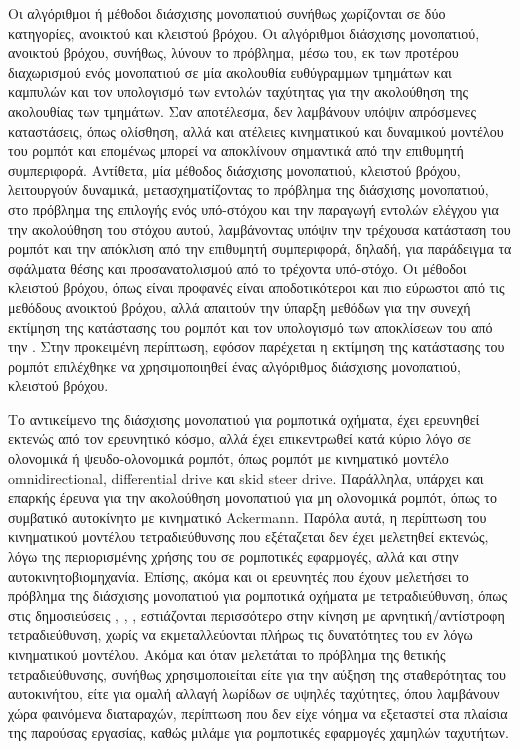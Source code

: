 \bigskip
Οι αλγόριθμοι ή μέθοδοι διάσχισης μονοπατιού συνήθως χωρίζονται σε δύο κατηγορίες, ανοικτού και κλειστού βρόχου. Οι αλγόριθμοι διάσχισης μονοπατιού, ανοικτού βρόχου, συνήθως, λύνουν το πρόβλημα, μέσω του, εκ των προτέρου διαχωρισμού ενός μονοπατιού σε μία ακολουθία ευθύγραμμων τμημάτων και καμπυλών και τον υπολογισμό των εντολών ταχύτητας για την ακολούθηση της ακολουθίας των τμημάτων. Σαν αποτέλεσμα, δεν λαμβάνουν υπόψιν απρόσμενες καταστάσεις, όπως ολίσθηση, αλλά και ατέλειες κινηματικού και δυναμικού μοντέλου του ρομπότ και επομένως μπορεί να αποκλίνουν σημαντικά από την επιθυμητή συμπεριφορά. Αντίθετα, μία μέθοδος διάσχισης μονοπατιού, κλειστού βρόχου, λειτουργούν δυναμικά, μετασχηματίζοντας το πρόβλημα της διάσχισης μονοπατιού, στο πρόβλημα της επιλογής ενός υπό-στόχου και την παραγωγή εντολών ελέγχου για την ακολούθηση του στόχου αυτού, λαμβάνοντας υπόψιν την τρέχουσα κατάσταση του ρομπότ και την απόκλιση από την επιθυμητή συμπεριφορά, δηλαδή, για παράδειγμα τα σφάλματα θέσης και προσανατολισμού από το τρέχοντα υπό-στόχο. Οι μέθοδοι κλειστού βρόχου, όπως είναι προφανές είναι αποδοτικότεροι και πιο εύρωστοι από τις μεθόδους ανοικτού βρόχου, αλλά απαιτούν την ύπαρξη μεθόδων για την συνεχή εκτίμηση της κατάστασης του ρομπότ και τον υπολογισμό των αποκλίσεων του από την . Στην προκειμένη περίπτωση, εφόσον παρέχεται η εκτίμηση της κατάστασης του ρομπότ επιλέχθηκε να χρησιμοποιηθεί ένας αλγόριθμος διάσχισης μονοπατιού, κλειστού βρόχου.

\bigskip
Το αντικείμενο της διάσχισης μονοπατιού για ρομποτικά οχήματα, έχει ερευνηθεί εκτενώς από τον ερευνητικό κόσμο, αλλά έχει επικεντρωθεί κατά κύριο λόγο σε ολονομικά ή ψευδο-ολονομικά ρομπότ, όπως ρομπότ με κινηματικό μοντέλο omnidirectional, differential drive και skid steer drive. Παράλληλα, υπάρχει και επαρκής έρευνα για την ακολούθηση μονοπατιού για μη ολονομικά ρομπότ, όπως το συμβατικό αυτοκίνητο με κινηματικό Ackermann. Παρόλα αυτά, η περίπτωση του κινηματικού μοντέλου τετραδιεύθυνσης που εξέταζεται δεν έχει μελετηθεί εκτενώς, λόγω της περιορισμένης χρήσης του σε ρομποτικές εφαρμογές, αλλά και στην αυτοκινητοβιομηχανία. Επίσης, ακόμα και οι ερευνητές που έχουν μελετήσει το πρόβλημα της διάσχισης μονοπατιού για ρομποτικά οχήματα με τετραδιεύθυνση, όπως στις δημοσιεύσεις \cite{sm_ptc}, \cite{hybrid_ptc}, \cite{fuzzy_ptc_counter_steering}, εστιάζονται περισσότερο στην κίνηση με αρνητική/αντίστροφη τετραδιεύθυνση, χωρίς να εκμεταλλεύονται πλήρως τις δυνατότητες του εν λόγω κινηματικού μοντέλου. Ακόμα και όταν μελετάται το πρόβλημα της θετικής τετραδιεύθυνσης, συνήθως χρησιμοποιείται είτε για την αύξηση της σταθερότητας του αυτοκινήτου, είτε για ομαλή αλλαγή λωρίδων σε υψηλές ταχύτητες, όπου λαμβάνουν χώρα φαινόμενα διαταραχών, περίπτωση που δεν είχε νόημα να εξεταστεί στα πλαίσια της παρούσας εργασίας, καθώς μιλάμε για ρομποτικές εφαρμογές χαμηλών ταχυτήτων.

